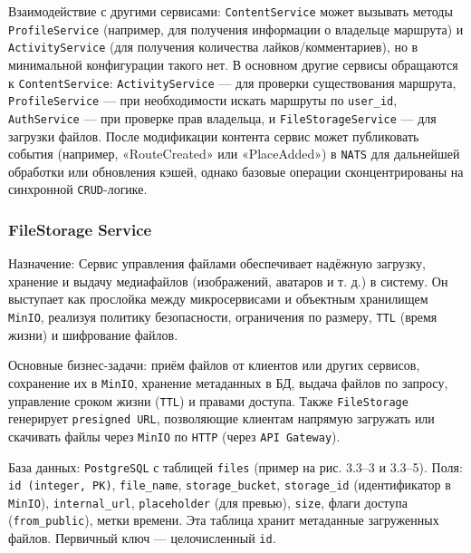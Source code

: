 Взаимодействие с другими сервисами: \texttt{ContentService} может вызывать методы \texttt{ProfileService} (например, для получения информации о владельце маршрута) и \texttt{ActivityService} (для получения количества лайков/комментариев), но в минимальной конфигурации такого нет. В основном другие сервисы обращаются к \texttt{ContentService}: \texttt{ActivityService} — для проверки существования маршрута, \texttt{ProfileService} — при необходимости искать маршруты по \texttt{user\_id}, \texttt{AuthService} — при проверке прав владельца, и \texttt{FileStorageService} — для загрузки файлов. После модификации контента сервис может публиковать события (например, «RouteCreated» или «PlaceAdded») в \texttt{NATS} для дальнейшей обработки или обновления кэшей, однако базовые операции сконцентрированы на синхронной \texttt{CRUD}-логике.

\subsubsection*{FileStorage Service}
Назначение: Сервис управления файлами обеспечивает надёжную загрузку, хранение и выдачу медиафайлов (изображений, аватаров и т. д.) в систему. Он выступает как прослойка между микросервисами и объектным хранилищем \texttt{MinIO}, реализуя политику безопасности, ограничения по размеру, \texttt{TTL} (время жизни) и шифрование файлов.

Основные бизнес-задачи: приём файлов от клиентов или других сервисов, сохранение их в \texttt{MinIO}, хранение метаданных в БД, выдача файлов по запросу, управление сроком жизни (\texttt{TTL}) и правами доступа. Также \texttt{FileStorage} генерирует \texttt{presigned URL}, позволяющие клиентам напрямую загружать или скачивать файлы через \texttt{MinIO} по \texttt{HTTP} (через \texttt{API Gateway}).

База данных: \texttt{PostgreSQL} с таблицей \texttt{files} (пример на рис. 3.3–3 и 3.3–5). Поля: \texttt{id (integer, PK)}, \texttt{file\_name}, \texttt{storage\_bucket}, \texttt{storage\_id} (идентификатор в \texttt{MinIO}), \texttt{internal\_url}, \texttt{placeholder} (для превью), \texttt{size}, флаги доступа (\texttt{from\_public}), метки времени. Эта таблица хранит метаданные загруженных файлов. Первичный ключ — целочисленный \texttt{id}.

